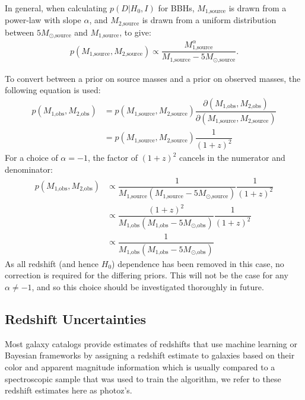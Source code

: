 \documentclass[a4paper,10pt]{article}
\begin{document}
In general, when calculating $p(D|H_0,I)$ for BBHs, $M_{\text{1,source}}$ is drawn from a power-law with slope $\alpha$, and $M_{\text{2,source}}$ is drawn from a uniform distribution between $5M_{\odot\text{,source}}$ and $M_{\text{1,source}}$, to give:
\begin{equation}
\begin{aligned}
p(M_{\text{1,source}},M_{\text{2,source}}) \propto \dfrac{M_{\text{1,source}}^\alpha}{M_{\text{1,source}}-5M_{\odot\text{,source}}}.
\end{aligned}
\end{equation}

To convert between a prior on source masses and a prior on observed masses, the following equation is used:
\begin{equation}
\begin{aligned}
p(M_{\text{1,obs}},M_{\text{2,obs}}) &= p(M_{\text{1,source}},M_{\text{2,source}}) \dfrac{\partial(M_{\text{1,obs}},M_{\text{2,obs}})}{\partial(M_{\text{1,source}},M_{\text{2,source}})}
\\ &= p(M_{\text{1,source}},M_{\text{2,source}}) \dfrac{1}{(1+z)^2}
\end{aligned}
\end{equation}
For a choice of $\alpha=-1$, the factor of $(1+z)^2$ cancels in the numerator and denominator:
\begin{equation}
\begin{aligned}
p(M_{\text{1,obs}},M_{\text{2,obs}}) &\propto \dfrac{1}{M_{\text{1,source}}(M_{\text{1,source}}-5M_{\odot\text{,source}})} \dfrac{1}{(1+z)^2}
\\ &\propto \dfrac{(1+z)^2}{M_{\text{1,obs}}(M_{\text{1,obs}}-5M_{\odot\text{,obs}})} \dfrac{1}{(1+z)^2}
\\ &\propto \dfrac{1}{M_{\text{1,obs}}(M_{\text{1,obs}}-5M_{\odot\text{,obs}})}
\end{aligned}
\end{equation}
As all redshift (and hence $H_0$) dependence has been removed in this case, no correction is required for the differing priors.  This will not be the case for any $\alpha \neq -1$, and so this choice should be investigated thoroughly in future.


\subsection{Redshift Uncertainties}
Most galaxy catalogs provide estimates of redshifts that use machine learning or Bayesian frameworks by assigning a redshift estimate to galaxies based on their color and apparent magnitude information which is usually compared to a spectroscopic sample that was used to train the algorithm, we refer to these redshift estimates here as photoz's.
\end{document}
